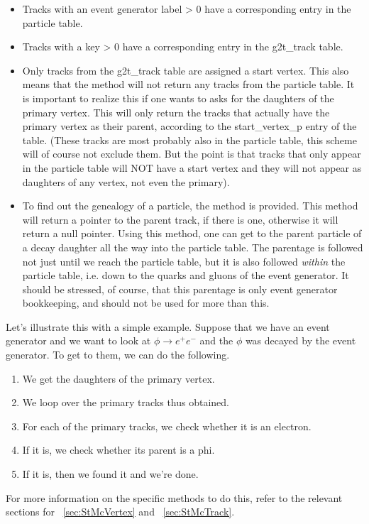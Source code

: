 \begin{itemize}
	\item Tracks with an event generator label > 0 have a corresponding
	entry in the particle table.
	\item Tracks with a key > 0 have a corresponding entry in the g2t\_track
	table.
	\item Only tracks from the g2t\_track table are assigned a start vertex.  This also means that
	the method  will not return any tracks from the particle
	table.  It is important to realize this if one wants to asks for the daughters of the
	primary vertex.  This will only return the tracks that actually have the primary
	vertex as their parent, according to the start\_vertex\_p entry of the table.  (These tracks
	are most probably also in the particle table, this scheme will of course not exclude them.  But
	the point is that tracks that only appear in the particle table will NOT have a start vertex
	and they will not appear as daughters of any vertex, not even the primary).
	\item To find out the genealogy of a particle, the  method is provided.
	This method will return a pointer to the parent track, if there is one, otherwise it will return
	a null pointer.  Using this method, one can get to the parent particle of a decay daughter all
	the way into the particle table.  The parentage is followed not just until we reach the
	particle table, but it is also followed {\it within} the particle table, i.e. down to the quarks and gluons
	of the event generator.
	It should be stressed, of course, that
	this parentage is only event generator bookkeeping, and should not be used for more than this.	
\end{itemize}
Let's illustrate this with a simple example.  Suppose that we have an event generator and
we want to look at $\phi \longrightarrow e^{+}e^{-}$ and the $\phi$ was decayed by the
event generator.  To get to them, we can do the following.
\begin{enumerate}
	\item We get the daughters of the primary vertex.
	\item We loop over the primary tracks thus obtained.
	\item For each of the primary tracks, we check whether it is an electron.
	\item If it is, we check whether its parent is a phi.
	\item If it is, then we found it and we're done.
\end{enumerate}
For more information on the specific methods to do this, refer to the relevant sections for
 ~\ref{sec:StMcVertex} and   ~\ref{sec:StMcTrack}.

